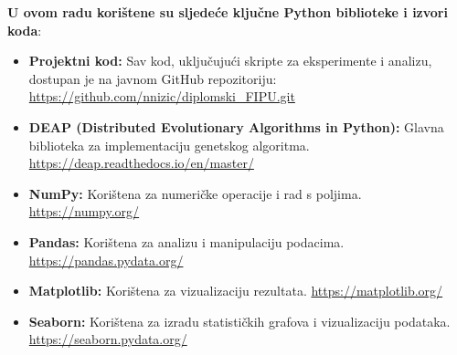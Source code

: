 \textbf{U ovom radu korištene su sljedeće ključne Python biblioteke i izvori koda}:

\begin{itemize}
    \item \textbf{Projektni kod:} Sav kod, uključujući skripte za eksperimente i analizu, dostupan je na javnom GitHub repozitoriju:
    \url{https://github.com/nnizic/diplomski_FIPU.git}

    \item \textbf{DEAP (Distributed Evolutionary Algorithms in Python):} Glavna biblioteka za implementaciju genetskog algoritma.
    \url{https://deap.readthedocs.io/en/master/}

    \item \textbf{NumPy:} Korištena za numeričke operacije i rad s poljima.
    \url{https://numpy.org/}

    \item \textbf{Pandas:} Korištena za analizu i manipulaciju podacima.
    \url{https://pandas.pydata.org/}

    \item \textbf{Matplotlib:} Korištena za vizualizaciju rezultata.
    \url{https://matplotlib.org/}

    \item \textbf{Seaborn:} Korištena za izradu statističkih grafova i vizualizaciju podataka.
    \url{https://seaborn.pydata.org/}
\end{itemize}
